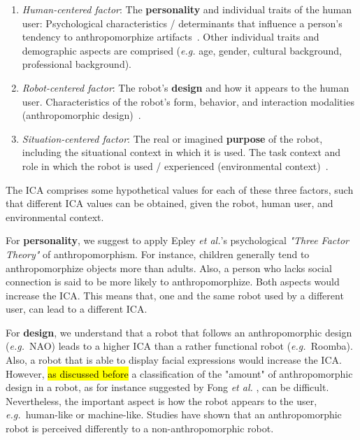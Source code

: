 \documentclass[lettersize, apacite, twoside, HRI]{apa_HRI}
\newcommand{\eg}{{\textit{e.g.~}}}
\begin{document}
\begin{enumerate}

    \item \emph{Human-centered factor}: The \textbf{personality} and individual traits of the human user: Psychological characteristics / determinants that influence a person's tendency to anthropomorphize artifacts~\cite{epley_seeing_2007}. Other individual traits and demographic aspects are comprised (\textit{e.g.} age, gender, cultural background, professional background).
	
    \item \emph{Robot-centered factor}: The robot's \textbf{design} and how it appears to the human user. Characteristics of the robot's form, behavior, and interaction modalities (anthropomorphic design)~\cite{fong_survey_2003}.
	
    \item \emph{Situation-centered factor}: The real or imagined \textbf{purpose} of the robot, including the situational context in which it is used. The task context and role in which the robot is used / experienced (environmental context)~\cite{joosse_what_2013}.

\end{enumerate}	

The ICA comprises some hypothetical values for each of these three factors, such that different ICA values can be obtained, given the robot, human user, and environmental context.
	
	For \textbf{personality}, we suggest to apply Epley \textit{et al.}'s \cite{epley_seeing_2007} psychological \textit{"Three Factor Theory"} of anthropomorphism. For instance, children generally tend to anthropomorphize objects more than adults. Also, a person who lacks social connection is said to be more likely to anthropomorphize. Both aspects would increase the ICA. This means that, one and the same robot used by a different user, can lead to a different ICA.
	
    For \textbf{design}, we understand that a robot that follows an anthropomorphic design (\eg NAO) leads to a higher ICA than a rather functional robot (\eg Roomba). Also, a robot that is able to display facial expressions would increase the ICA. However, \hl{as discussed before} a classification of the "amount" of anthropomorphic design in a robot, as for instance suggested by Fong \textit{et al.} \cite{fong_survey_2003}, can be difficult. Nevertheless, the important aspect is how the robot appears to the user, \eg human-like or machine-like. Studies have shown that an anthropomorphic robot is perceived differently to a non-anthropomorphic robot.
	
\end{document}

